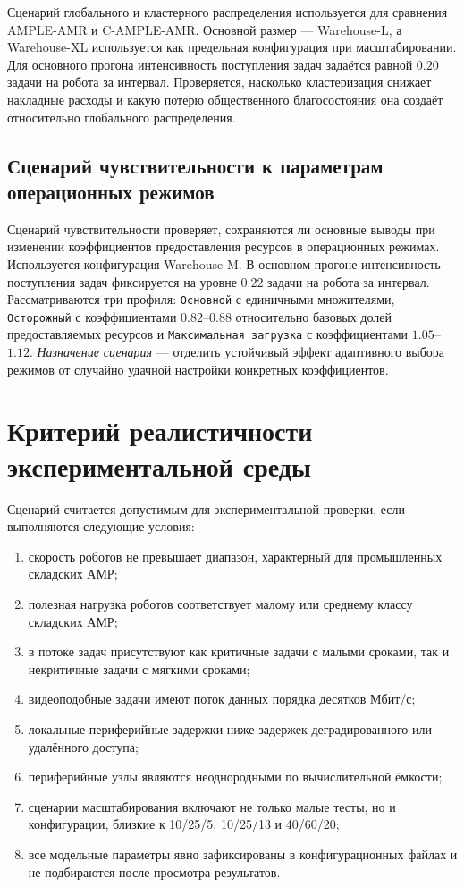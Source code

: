 Сценарий глобального и кластерного распределения используется для сравнения AMPLE-AMR и C-AMPLE-AMR. Основной размер --- Warehouse-L, а Warehouse-XL используется как предельная конфигурация при масштабировании. Для основного прогона интенсивность поступления задач задаётся равной $0.20$ задачи на робота за интервал. Проверяется, насколько кластеризация снижает накладные расходы и какую потерю общественного благосостояния она создаёт относительно глобального распределения.

\subsection{Сценарий чувствительности к параметрам операционных режимов}

Сценарий чувствительности проверяет, сохраняются ли основные выводы при изменении коэффициентов предоставления ресурсов в операционных режимах. Используется конфигурация Warehouse-M. В основном прогоне интенсивность поступления задач фиксируется на уровне $0.22$ задачи на робота за интервал. Рассматриваются три профиля: \texttt{Основной} с единичными множителями, \texttt{Осторожный} с коэффициентами $0.82$--$0.88$ относительно базовых долей предоставляемых ресурсов и \texttt{Максимальная загрузка} с коэффициентами $1.05$--$1.12$. \textit{Назначение сценария} --- отделить устойчивый эффект адаптивного выбора режимов от случайно удачной настройки конкретных коэффициентов.

\section{Критерий реалистичности экспериментальной среды}

Сценарий считается допустимым для экспериментальной проверки, если выполняются следующие условия:
\begin{enumerate}
	\item скорость роботов не превышает диапазон, характерный для промышленных складских АМР;
	\item полезная нагрузка роботов соответствует малому или среднему классу складских АМР;
	\item в потоке задач присутствуют как критичные задачи с малыми сроками, так и некритичные задачи с мягкими сроками;
	\item видеоподобные задачи имеют поток данных порядка десятков Мбит/с;
	\item локальные периферийные задержки ниже задержек деградированного или удалённого доступа;
	\item периферийные узлы являются неоднородными по вычислительной ёмкости;
	\item сценарии масштабирования включают не только малые тесты, но и конфигурации, близкие к 10/25/5, 10/25/13 и 40/60/20;
	\item все модельные параметры явно зафиксированы в конфигурационных файлах и не подбираются после просмотра результатов.
\end{enumerate}

